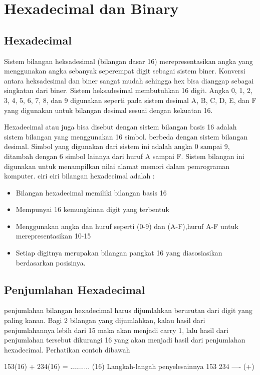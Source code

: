 \section {Hexadecimal dan Binary}

\subsection {Hexadecimal}
Sistem bilangan heksadesimal (bilangan dasar 16) merepresentasikan angka yang menggunakan angka sebanyak seperempat digit sebagai sistem biner. Konversi antara heksadesimal dan biner sangat mudah sehingga hex bisa dianggap sebagai singkatan dari biner. Sistem heksadesimal membutuhkan 16 digit. Angka 0, 1, 2, 3, 4, 5, 6, 7, 8, dan 9 digunakan seperti pada sistem desimal A, B, C, D, E, dan F yang digunakan untuk bilangan desimal sesuai dengan kekuatan 16. 
	
Hexadecimal atau juga bisa disebut dengan sistem bilangan basis 16 adalah sistem bilangan yang menggunakan 16 simbol. berbeda dengan sistem bilangan desimal. Simbol yang digunakan dari sistem ini adalah angka 0 sampai 9, ditambah dengan 6 simbol lainnya dari huruf A sampai F. Sistem bilangan ini digunakan untuk menampilkan nilai alamat memori dalam pemrograman komputer.
ciri ciri bilangan hexadecimal adalah :

\begin{itemize}
	\item Bilangan hexadecimal memiliki bilangan basis 16
	\item Mempunyai 16 kemungkinan digit yang terbentuk
	\item Menggunakan angka dan huruf seperti (0-9) dan (A-F),huruf A-F untuk merepresentasikan 10-15
	\item Setiap digitnya merupakan bilangan pangkat 16 yang diasosiasikan berdasarkan posisinya.
\end{itemize}

\subsection {Penjumlahan Hexadecimal}
penjumlahan bilangan hexadecimal harus dijumlahkan berurutan dari digit yang paling kanan. Bagi 2 bilangan yang dijumlahkan, kalau hasil dari penjumlahannya lebih dari 15 maka akan menjadi carry 1, lalu hasil dari penjumlahan tersebut dikurangi 16 yang akan menjadi hasil dari penjumlahan hexadecimal. Perhatikan contoh dibawah

153(16) + 234(16) = .......... (16) 
Langkah-langah penyelesainnya
153 
234 
---- (+)

